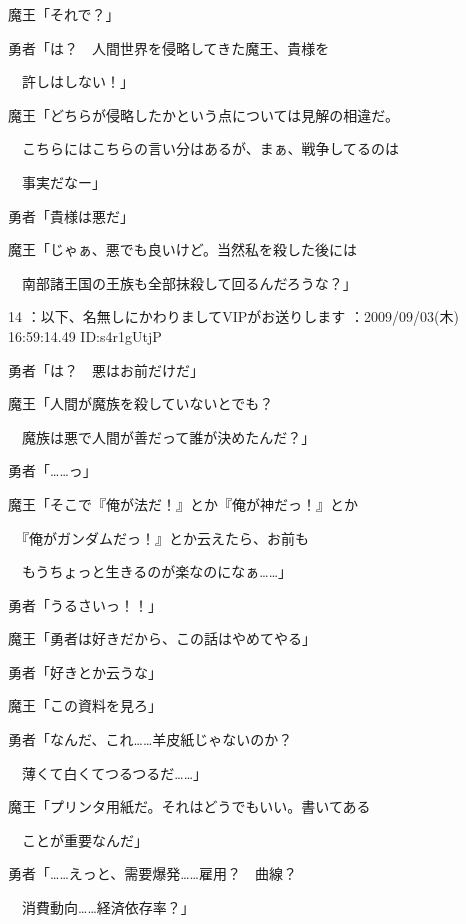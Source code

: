 \documentclass[a4j,twocolumn]{tarticle}
\begin{document}
魔王「それで？」 



勇者「は？　人間世界を侵略してきた魔王、貴様を\par{} 
　許しはしない！」 



魔王「どちらが侵略したかという点については見解の相違だ。\par{} 
　こちらにはこちらの言い分はあるが、まぁ、戦争してるのは\par{} 
　事実だなー」 



勇者「貴様は悪だ」 



魔王「じゃぁ、悪でも良いけど。当然私を殺した後には\par{} 
　南部諸王国の王族も全部抹殺して回るんだろうな？」

	
     
	

14 ：以下、名無しにかわりましてVIPがお送りします ：2009/09/03(木) 16:59:14.49 ID:s4r1gUtjP 


勇者「は？　悪はお前だけだ」\par{} 
魔王「人間が魔族を殺していないとでも？\par{} 
　魔族は悪で人間が善だって誰が決めたんだ？」 



勇者「……っ」 



魔王「そこで『俺が法だ！』とか『俺が神だっ！』とか\par{} 
　『俺がガンダムだっ！』とか云えたら、お前も\par{} 
　もうちょっと生きるのが楽なのになぁ……」



勇者「うるさいっ！！」 



魔王「勇者は好きだから、この話はやめてやる」\par{} 
勇者「好きとか云うな」 



魔王「この資料を見ろ」\par{} 
勇者「なんだ、これ……羊皮紙じゃないのか？\par{} 
　薄くて白くてつるつるだ……」\par{} 
魔王「プリンタ用紙だ。それはどうでもいい。書いてある\par{} 
　ことが重要なんだ」 



勇者「……えっと、需要爆発……雇用？　曲線？\par{} 
　消費動向……経済依存率？」
\end{document}
